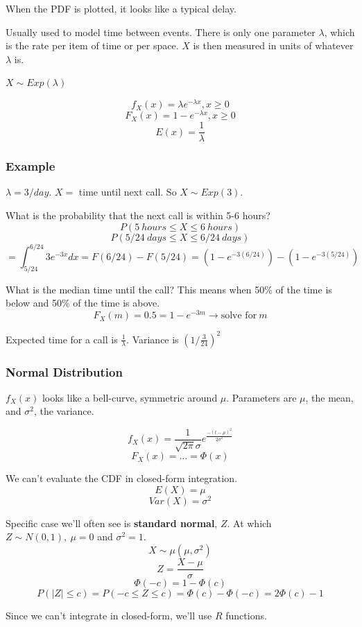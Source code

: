 \documentclass{article}
\newcommand{\var}{\sigma^2}
\begin{document}
When the PDF is plotted, it looks like a typical delay.

Usually used to model time between events. There is only one parameter $\lambda$, which is the rate per item of time or per space. $X$ is then measured in units of whatever $\lambda$ is.

$X \sim Exp(\lambda)$

$$f_X(x) = \lambda e^{-\lambda x}, x \geq 0$$
$$F_X(x) = 1-e^{-\lambda x}, x \geq 0$$
$$E(x) = \frac{1}{\lambda}$$


\subsubsection*{Example}

$\lambda = 3/day$. $X = $ time until next call. So $X \sim Exp(3)$.

What is the probability that the next call is within 5-6 hours? $$P(5\ hours \leq X \leq 6\ hours)$$ $$P(5/24\ days \leq X \leq 6/24\ days)$$
$$ = \int_{5/24}^{6/24} 3e^{-3x} dx = F(6/24) - F(5/24) = (1-e^{-3(6/24)}) - (1-e^{-3(5/24)}) $$

What is the median time until the call? This means when 50\% of the time is below and 50\% of the time is above. $$F_X(m) = 0.5 = 1-e^{-3m} \rightarrow \text{solve for}\ m$$

Expected time for a call is $\frac{1}{\lambda}$. Variance is $\left( 1/\frac{3}{24} \right)^2$ 

\subsubsection{Normal Distribution}

$f_X(x)$ looks like a bell-curve, symmetric around $\mu$. Parameters are $\mu$, the mean, and $\sigma^2$, the variance.

$$ f_X(x) = \frac{1}{\sqrt{2 \pi} \sigma} e^{\frac{-(t-\mu)^2}{2 \sigma^2}}$$ $$F_X(x) = \dots = \Phi(x)$$ 

We can't evaluate the CDF in closed-form integration.
$$E(X) = \mu$$ $$Var(X) = \sigma^2$$

Specific case we'll often see is \textbf{standard normal}, $Z$. At which $Z \sim N(0,1),\ \mu=0$ and $\sigma^2=1$.
$$ X \sim \mu(\mu, \var)$$ $$ Z = \frac{X-\mu}{\sigma}$$
$$\Phi(-c) = 1-\Phi(c)$$
$$P(|Z|\leq c) = P(-c \leq Z \leq c) = \Phi(c) - \Phi(-c) = 2\Phi(c) -1 $$ 

Since we can't integrate in closed-form, we'll use $R$ functions.
\end{document}
